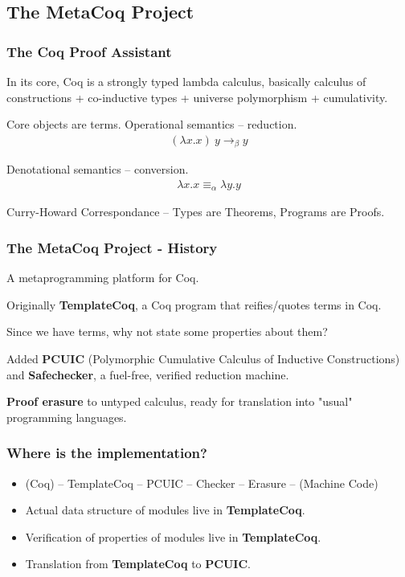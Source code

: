 
\subsection{The MetaCoq Project}

\begin{frame}
  \frametitle{The Coq Proof Assistant}

  In its core, Coq is a strongly typed lambda calculus, basically calculus of
  constructions + co-inductive types + universe polymorphism + cumulativity.
  \pause

  Core objects are terms. Operational semantics -- reduction.
  \begin{align*}
    (\lambda x.x)\ y \to_\beta y
  \end{align*}
  \pause

  Denotational semantics -- conversion.
  \begin{align*}
    \lambda x.x\equiv_\alpha\lambda y.y
  \end{align*}

  Curry-Howard Correspondance -- Types are Theorems, Programs are Proofs.

\end{frame}

\begin{frame}
  \frametitle{The MetaCoq Project - History}
  A metaprogramming platform for Coq.

  Originally \textbf{TemplateCoq}, a Coq program that reifies/quotes terms in
  Coq.\pause

  Since we have terms, why not state some properties about them?\pause
    
  Added \textbf{PCUIC} (Polymorphic Cumulative Calculus of Inductive
  Constructions) and \textbf{Safechecker}, a fuel-free, verified reduction
  machine.
  \pause

  \textbf{Proof erasure} to untyped calculus, ready for translation into "usual"
  programming languages. \pause
\end{frame}

\begin{frame}
  \frametitle{Where is the implementation?}
  \begin{itemize}
    \item (Coq) -- TemplateCoq -- PCUIC -- Checker -- Erasure -- (Machine Code)
    \item Actual data structure of modules live in \textbf{TemplateCoq}.
    \item Verification of properties of modules live in \textbf{TemplateCoq}.
    \item Translation from \textbf{TemplateCoq} to \textbf{PCUIC}.
  \end{itemize}
\end{frame}

